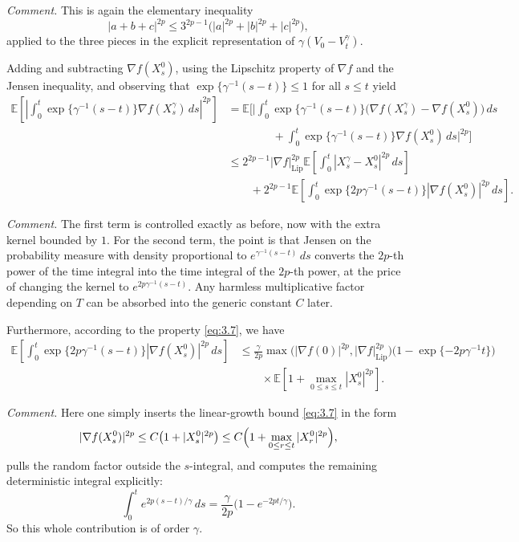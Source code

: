 \documentclass[11pt]{article}
\begin{document}
{\color{teal}
\noindent\emph{Comment.} This is again the elementary inequality
\[
|a+b+c|^{2p}\le 3^{2p-1}\bigl(|a|^{2p}+|b|^{2p}+|c|^{2p}\bigr),
\]
applied to the three pieces in the explicit representation of $\gamma(V_0-V_t^\gamma)$.
}


Adding and subtracting $\nabla f(X_s^0)$, using the Lipschitz property of $\nabla f$ and the Jensen inequality, and observing that $\exp\{\gamma^{-1}(s-t)\}\le 1$ for all $s\le t$ yield
\[
\begin{aligned}
\mathbb{E}\left[\left|\int_0^t \exp\{\gamma^{-1}(s-t)\}\nabla f(X_s^{\gamma})\,ds\right|^{2p}\right]
&=\mathbb{E}\Biggl[\Biggl|\int_0^t \exp\{\gamma^{-1}(s-t)\}\bigl(\nabla f(X_s^{\gamma})-\nabla f(X_s^0)\bigr)\,ds \\
&\qquad\qquad +\int_0^t \exp\{\gamma^{-1}(s-t)\}\nabla f(X_s^0)\,ds\Biggr|^{2p}\Biggr] \\
&\le 2^{2p-1}|\nabla f|_{\mathrm{Lip}}^{2p}\mathbb{E}\left[\int_0^t |X_s^{\gamma}-X_s^0|^{2p}\,ds\right] \\
&\qquad +2^{2p-1}\mathbb{E}\left[\int_0^t \exp\{2p\gamma^{-1}(s-t)\}|\nabla f(X_s^0)|^{2p}\,ds\right].
\end{aligned}
\]

{\color{teal}
\noindent\emph{Comment.} The first term is controlled exactly as before, now with the extra kernel bounded by $1$. For the second term, the point is that Jensen on the probability measure with density proportional to $e^{\gamma^{-1}(s-t)}\,ds$ converts the $2p$-th power of the time integral into the time integral of the $2p$-th power, at the price of changing the kernel to $e^{2p\gamma^{-1}(s-t)}$. Any harmless multiplicative factor depending on $T$ can be absorbed into the generic constant $C$ later.
}

Furthermore, according to the property \eqref{eq:3.7}, we have
\[
\begin{aligned}
\mathbb{E}\left[\int_0^t \exp\{2p\gamma^{-1}(s-t)\}|\nabla f(X_s^0)|^{2p}\,ds\right]
&\le \frac{\gamma}{2p}\max\bigl(|\nabla f(0)|^{2p},|\nabla f|_{\mathrm{Lip}}^{2p}\bigr)\bigl(1-\exp\{-2p\gamma^{-1}t\}\bigr) \\
&\qquad\times \mathbb{E}\left[1+\max_{0\le s\le t}|X_s^0|^{2p}\right].
\end{aligned}
\]

{\color{teal}
\noindent\emph{Comment.} Here one simply inserts the linear-growth bound \eqref{eq:3.7} in the form
\[
|\nabla f(X_s^0)|^{2p}\le C\bigl(1+|X_s^0|^{2p}\bigr)\le C\Bigl(1+\max_{0\le r\le t}|X_r^0|^{2p}\Bigr),
\]
pulls the random factor outside the $s$-integral, and computes the remaining deterministic integral explicitly:
\[
\int_0^t e^{2p(s-t)/\gamma}\,ds=\frac{\gamma}{2p}\bigl(1-e^{-2pt/\gamma}\bigr).
\]
So this whole contribution is of order $\gamma$.
}
\end{document}
